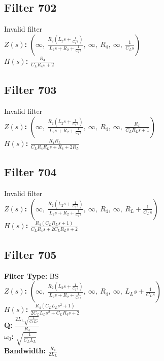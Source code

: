 \documentclass{article}
\begin{document}
\subsection*{Filter 702}
Invalid filter \\ 
\textbf{$Z(s)$:} $\left( \infty, \  \frac{R_{2} \left(L_{2} s + \frac{1}{C_{2} s}\right)}{L_{2} s + R_{2} + \frac{1}{C_{2} s}}, \  \infty, \  R_{4}, \  \infty, \  \frac{1}{C_{L} s}\right)$ \\ 
\textbf{$H(s)$:} $\frac{R_{4}}{C_{L} R_{4} s + 2}$ \\ 
\subsection*{Filter 703}
Invalid filter \\ 
\textbf{$Z(s)$:} $\left( \infty, \  \frac{R_{2} \left(L_{2} s + \frac{1}{C_{2} s}\right)}{L_{2} s + R_{2} + \frac{1}{C_{2} s}}, \  \infty, \  R_{4}, \  \infty, \  \frac{R_{L}}{C_{L} R_{L} s + 1}\right)$ \\ 
\textbf{$H(s)$:} $\frac{R_{4} R_{L}}{C_{L} R_{4} R_{L} s + R_{4} + 2 R_{L}}$ \\ 
\subsection*{Filter 704}
Invalid filter \\ 
\textbf{$Z(s)$:} $\left( \infty, \  \frac{R_{2} \left(L_{2} s + \frac{1}{C_{2} s}\right)}{L_{2} s + R_{2} + \frac{1}{C_{2} s}}, \  \infty, \  R_{4}, \  \infty, \  R_{L} + \frac{1}{C_{L} s}\right)$ \\ 
\textbf{$H(s)$:} $\frac{R_{4} \left(C_{L} R_{L} s + 1\right)}{C_{L} R_{4} s + 2 C_{L} R_{L} s + 2}$ \\ 
\subsection*{Filter 705}
\textbf{Filter Type:} BS \\ 
\textbf{$Z(s)$:} $\left( \infty, \  \frac{R_{2} \left(L_{2} s + \frac{1}{C_{2} s}\right)}{L_{2} s + R_{2} + \frac{1}{C_{2} s}}, \  \infty, \  R_{4}, \  \infty, \  L_{L} s + \frac{1}{C_{L} s}\right)$ \\ 
\textbf{$H(s)$:} $\frac{R_{4} \left(C_{L} L_{L} s^{2} + 1\right)}{2 C_{L} L_{L} s^{2} + C_{L} R_{4} s + 2}$ \\ 
\textbf{Q:} $\frac{2 L_{L} \sqrt{\frac{1}{C_{L} L_{L}}}}{R_{4}}$ \\ 
\textbf{$\omega_0$:} $\sqrt{\frac{1}{C_{L} L_{L}}}$ \\ 
\textbf{Bandwidth:} $\frac{R_{4}}{2 L_{L}}$ \\ 
\end{document}
